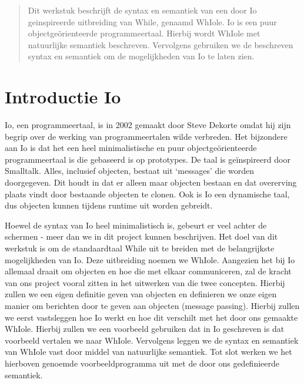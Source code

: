 \documentclass[12pt]{article}
\begin{document}
\maketitle

\begin{abstract}
Dit werkstuk beschrijft de syntax en semantiek van een door Io geinspireerde uitbreiding van While, genaamd WhIole. Io is een puur objectge\"orienteerde programmeertaal. Hierbij wordt WhIole met natuurlijke semantiek beschreven. Vervolgens gebruiken we de beschreven syntax en semantiek om
de mogelijkheden van Io te laten zien.
\end{abstract}

\section{Introductie Io}
Io, een programmeertaal, is in 2002 gemaakt door Steve Dekorte omdat hij zijn begrip over de werking van programmeertalen wilde verbreden.
Het bijzondere aan Io is dat het een heel minimalistische en puur objectge\"orienteerde programmeertaal is die gebaseerd is op prototypes. De taal is ge\"inspireerd door Smalltalk. Alles, inclusief objecten, bestaat uit `messages' die worden doorgegeven.
Dit houdt in dat er alleen maar objecten bestaan en dat overerving plaats vindt door bestaande objecten te clonen.
Ook is Io een dynamische taal, dus objecten kunnen tijdens runtime uit worden gebreidt.

Hoewel de syntax van Io heel minimalistisch is, gebeurt er veel achter de schermen - meer dan we in dit project kunnen beschrijven.
Het doel van dit werkstuk is om de standaardtaal While uit te breiden met de belangrijkste mogelijkheden van Io.
Deze uitbreiding noemen we WhIole.
Aangezien het bij Io allemaal draait om objecten en hoe die met elkaar communiceren, zal de kracht van ons project vooral zitten in het uitwerken van die twee concepten.
Hierbij zullen we een eigen definitie geven van objecten en definieren we onze eigen manier om berichten door te geven aan objecten (message passing).
Hierbij zullen we eerst vastsleggen hoe Io werkt en hoe dit verschilt met het door ons gemaakte WhIole.
Hierbij zullen we een voorbeeld gebruiken dat in Io geschreven is dat voorbeeld vertalen we naar WhIole.
Vervolgens leggen we de syntax en semantiek van WhIole vast door middel van natuurlijke semantiek.
Tot slot werken we het hierboven genoemde voorbeeldprogramma uit met de door ons gedefinieerde semantiek. 
\end{document}
